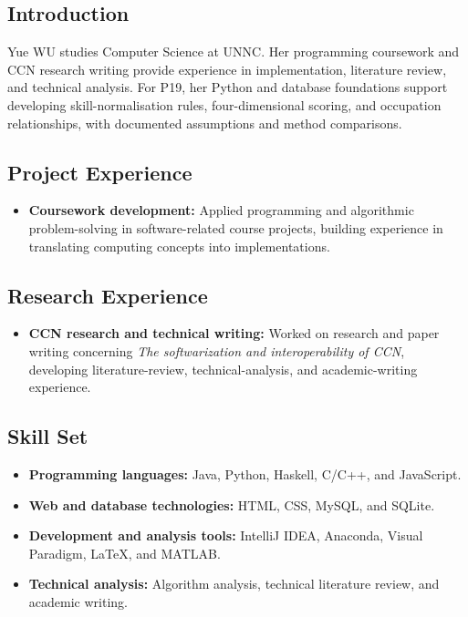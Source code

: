 \documentclass[a4paper,12pt]{article}
\begin{document}
\subsection*{Introduction}
Yue WU studies Computer Science at UNNC. Her programming coursework and CCN research writing provide experience in implementation, literature review, and technical analysis. For P19, her Python and database foundations support developing skill-normalisation rules, four-dimensional scoring, and occupation relationships, with documented assumptions and method comparisons.

\subsection*{Project Experience}
\begin{itemize}
  \item \textbf{Coursework development:} Applied programming and algorithmic problem-solving in software-related course projects, building experience in translating computing concepts into implementations.
\end{itemize}

\subsection*{Research Experience}
\begin{itemize}
  \item \textbf{CCN research and technical writing:} Worked on research and paper writing concerning \emph{The softwarization and interoperability of CCN}, developing literature-review, technical-analysis, and academic-writing experience.
\end{itemize}

\subsection*{Skill Set}
\begin{itemize}
  \item \textbf{Programming languages:} Java, Python, Haskell, C/C++, and JavaScript.
  \item \textbf{Web and database technologies:} HTML, CSS, MySQL, and SQLite.
  \item \textbf{Development and analysis tools:} IntelliJ IDEA, Anaconda, Visual Paradigm, LaTeX, and MATLAB.
  \item \textbf{Technical analysis:} Algorithm analysis, technical literature review, and academic writing.
\end{itemize}
\end{document}
